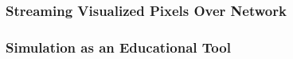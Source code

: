 \subsubsection{Streaming Visualized Pixels Over Network}

\subsubsection{Simulation as an Educational Tool}
%
%



